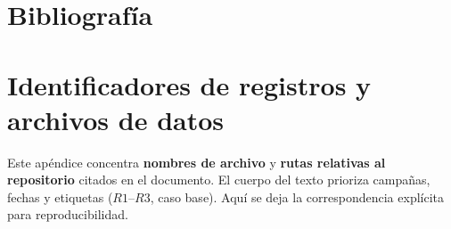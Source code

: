 \documentclass[12pt,a4paper]{report}
\begin{document}
\chapter{Bibliografía}
\printbibliography[heading=none]

\appendix

\chapter{Identificadores de registros y archivos de datos}
\label{sec:appendix_data}

Este apéndice concentra \textbf{nombres de archivo} y \textbf{rutas relativas al
repositorio} citados en el documento. El cuerpo del texto prioriza campañas,
fechas y etiquetas (\(R1\)--\(R3\), caso base). Aquí se deja la correspondencia
explícita para reproducibilidad.
\end{document}
